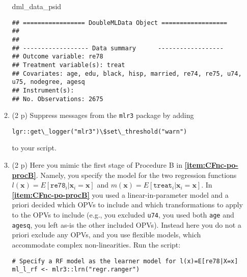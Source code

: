 \documentclass[
]{article}
\newenvironment{Shaded}{\begin{snugshade}}{\end{snugshade}}
\newcommand{\FunctionTok}[1]{\textcolor[rgb]{0.13,0.29,0.53}{\textbf{#1}}}
\newcommand{\NormalTok}[1]{#1}
\newcommand{\SpecialCharTok}[1]{\textcolor[rgb]{0.81,0.36,0.00}{\textbf{#1}}}
\newcommand{\StringTok}[1]{\textcolor[rgb]{0.31,0.60,0.02}{#1}}
\begin{document}
\begin{enumerate}
\begin{enumerate}
\begin{Shaded}
\begin{Highlighting}[]
\NormalTok{dml\_data\_psid}
\end{Highlighting}
\end{Shaded}

\begin{verbatim}
## ================= DoubleMLData Object ==================
## 
## 
## ------------------ Data summary      ------------------
## Outcome variable: re78
## Treatment variable(s): treat
## Covariates: age, edu, black, hisp, married, re74, re75, u74, u75, nodegree, agesq
## Instrument(s): 
## No. Observations: 2675
\end{verbatim}
  \item
    (2 p) Suppress messages from the \texttt{mlr3} package by adding

    \texttt{lgr::get\textbackslash{}\_logger("mlr3")\textbackslash{}\$set\textbackslash{}\_threshold("warn")}

    to your script.

\begin{Shaded}
\end{Shaded}
  \item
    (2 p) Here you mimic the first stage of Procedure B in
    \textbf{\ref{item:CFnc-po-procB}}. Namely, you specify the model for
    the two regression functions
    \(l(\mathbf{x})=E[\texttt{re78}_i|\mathbf{x}_{i}=\mathbf{x}]\) and
    \(m(\mathbf{x})=E[\texttt{treat}_i|\mathbf{x}_{i}=\mathbf{x}]\). In
    \textbf{\ref{item:CFnc-po-procB}} you used a linear-in-parameter
    model and a priori decided which OPVs to include and which
    transformations to apply to the OPVs to include (e.g., you excluded
    \texttt{u74}, you used both \texttt{age} and \texttt{agesq}, you
    left as-is the other included OPVs). Instead here you do not a
    priori exclude any OPVs, and you use flexible models, which
    accommodate complex non-linearities. Run the
    script:\label{item:dml-first-stage-models}

\begin{verbatim}
# Specify a RF model as the learner model for l(x)=E[re78|X=x]
ml_l_rf <- mlr3::lrn("regr.ranger")


\end{verbatim}
\end{enumerate}
\end{enumerate}
\end{document}
